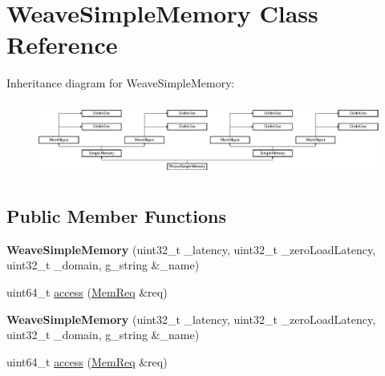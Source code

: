 \hypertarget{classWeaveSimpleMemory}{\section{Weave\-Simple\-Memory Class Reference}
\label{classWeaveSimpleMemory}
}
Inheritance diagram for Weave\-Simple\-Memory\-:\begin{figure}[H]
\begin{center}
\leavevmode
\includegraphics[height=2.464789cm]{classWeaveSimpleMemory}
\end{center}
\end{figure}
\subsection*{Public Member Functions}
\begin{DoxyCompactItemize}
\item 
\hypertarget{classWeaveSimpleMemory_a7350a0f098c10fecda7c9e5e16f9201a}{{\bfseries Weave\-Simple\-Memory} (uint32\-\_\-t \-\_\-latency, uint32\-\_\-t \-\_\-zero\-Load\-Latency, uint32\-\_\-t \-\_\-domain, g\-\_\-string \&\-\_\-name)}\label{classWeaveSimpleMemory_a7350a0f098c10fecda7c9e5e16f9201a}

\item 
uint64\-\_\-t \hyperlink{classWeaveSimpleMemory_a0d141c7a3424ded10f053c3cd7b72368}{access} (\hyperlink{structMemReq}{Mem\-Req} \&req)
\item 
\hypertarget{classWeaveSimpleMemory_a7350a0f098c10fecda7c9e5e16f9201a}{{\bfseries Weave\-Simple\-Memory} (uint32\-\_\-t \-\_\-latency, uint32\-\_\-t \-\_\-zero\-Load\-Latency, uint32\-\_\-t \-\_\-domain, g\-\_\-string \&\-\_\-name)}\label{classWeaveSimpleMemory_a7350a0f098c10fecda7c9e5e16f9201a}

\item 
uint64\-\_\-t \hyperlink{classWeaveSimpleMemory_a0d141c7a3424ded10f053c3cd7b72368}{access} (\hyperlink{structMemReq}{Mem\-Req} \&req)
\end{DoxyCompactItemize}


